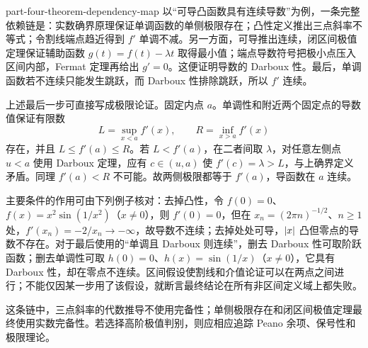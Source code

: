 \begin{solution}{part-four-theorem-dependency-map}
以“可导凸函数具有连续导数”为例，一条完整依赖链是：实数确界原理保证单调函数的单侧极限存在；凸性定义推出三点斜率不等式；令割线端点趋近得到 \(f'\) 单调不减。另一方面，可导推出连续，闭区间极值定理保证辅助函数 \(g(t)=f(t)-\lambda t\) 取得最小值；端点导数符号把极小点压入区间内部，Fermat 定理再给出 \(g'=0\)。这便证明导数的 Darboux 性。最后，单调函数若不连续只能发生跳跃，而 Darboux 性排除跳跃，所以 \(f'\) 连续。

上述最后一步可直接写成极限论证。固定内点 \(a\)。单调性和附近两个固定点的导数值保证有限数
\[
 L=\sup_{x<a}f'(x),\qquad R=\inf_{x>a}f'(x)
\]
存在，并且 \(L\le f'(a)\le R\)。若 \(L<f'(a)\)，在二者间取 \(\lambda\)，对任意左侧点 \(u<a\) 使用 Darboux 定理，应有 \(c\in(u,a)\) 使 \(f'(c)=\lambda>L\)，与上确界定义矛盾。同理 \(f'(a)<R\) 不可能。故两侧极限都等于 \(f'(a)\)，导函数在 \(a\) 连续。

主要条件的作用可由下列例子核对：去掉凸性，令 \(f(0)=0\)、\(f(x)=x^2\sin(1/x^2)\)（\(x\ne0\)），则 \(f'(0)=0\)，但在 \(x_n=(2\pi n)^{-1/2}\)、\(n\ge1\) 处，\(f'(x_n)=-2/x_n\to-\infty\)，故导数不连续；去掉处处可导，\(\left|x\right|\) 凸但零点的导数不存在。对于最后使用的“单调且 Darboux 则连续”，删去 Darboux 性可取阶跃函数；删去单调性可取 \(h(0)=0\)、\(h(x)=\sin(1/x)\)（\(x\ne0\)），它具有 Darboux 性，却在零点不连续。区间假设使割线和介值论证可以在两点之间进行；不能仅因某一步用了该假设，就断言最终结论在所有非区间定义域上都失败。

这条链中，三点斜率的代数推导不使用完备性；单侧极限存在和闭区间极值定理最终使用实数完备性。若选择高阶极值判别，则应相应追踪 Peano 余项、保号性和极限理论。
\end{solution}
